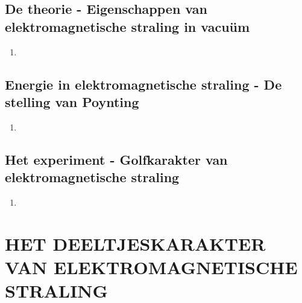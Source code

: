 \documentclass[12pt]{article}
\begin{document}
    \subsection{De theorie - Eigenschappen van elektromagnetische straling in vacuüm}
    \begin{enumerate}
        \item 
    \end{enumerate}
    \subsection{Energie in elektromagnetische straling - De stelling van Poynting}
    \begin{enumerate}
        \item 
    \end{enumerate}
    \subsection{Het experiment - Golfkarakter van elektromagnetische straling}
    \begin{enumerate}
        \item 
    \end{enumerate}



    \section{HET DEELTJESKARAKTER VAN ELEKTROMAGNETISCHE STRALING}
\end{document}
